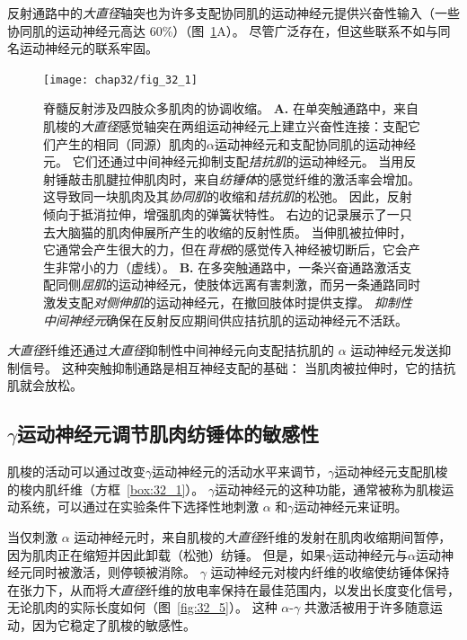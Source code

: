 反射通路中的\textit{大直径}轴突也为许多支配协同肌的运动神经元提供兴奋性输入（一些协同肌的运动神经元高达 60\%）（图~\ref{fig:32_1}A）。 
尽管广泛存在，但这些联系不如与同名运动神经元的联系牢固。


\begin{figure}[htbp]
	\centering
	\texttt{[image: chap32/fig\_32\_1]}
	\caption{脊髓反射涉及四肢众多肌肉的协调收缩。
		\textbf{A.} 在单突触通路中，来自肌梭的\textit{大直径}感觉轴突在两组运动神经元上建立兴奋性连接：支配它们产生的相同（同源）肌肉的$ \alpha $运动神经元和支配协同肌的运动神经元。 
		它们还通过中间神经元抑制支配\textit{拮抗肌}的运动神经元。
		当用反射锤敲击肌腱拉伸肌肉时，来自\textit{纺锤体}的感觉纤维的激活率会增加。
		这导致同一块肌肉及其\textit{协同肌}的收缩和\textit{拮抗肌}的松弛。
		因此，反射倾向于抵消拉伸，增强肌肉的弹簧状特性。
		右边的记录展示了一只去大脑猫的肌肉伸展所产生的收缩的反射性质。
		当伸肌被拉伸时，它通常会产生很大的力，但在\textit{背根}的感觉传入神经被切断后，它会产生非常小的力（虚线）\cite{liddell1924reflexes}。
		\textbf{B.} 在多突触通路中，一条兴奋通路激活支配同侧\textit{屈肌}的运动神经元，使肢体远离有害刺激，而另一条通路同时激发支配\textit{对侧伸肌}的运动神经元，在撤回肢体时提供支撑。
		\textit{抑制性中间神经元}确保在反射反应期间供应拮抗肌的运动神经元不活跃\cite{schmidt1989motor}。}
	\label{fig:32_1}
\end{figure}


\textit{大直径}纤维还通过\textit{大直径}抑制性中间神经元向支配拮抗肌的 $ \alpha $ 运动神经元发送抑制信号。
这种突触抑制通路是相互神经支配的基础：
当肌肉被拉伸时，它的拮抗肌就会放松。



\subsection{$ \gamma $运动神经元调节肌肉纺锤体的敏感性}

肌梭的活动可以通过改变$ \gamma $运动神经元的活动水平来调节，$ \gamma $运动神经元支配肌梭的梭内肌纤维（方框~\ref{box:32_1}）。
$ \gamma $运动神经元的这种功能，通常被称为肌梭运动系统，可以通过在实验条件下选择性地刺激 $ \alpha $ 和$ \gamma $运动神经元来证明。


当仅刺激 $ \alpha $ 运动神经元时，来自肌梭的\textit{大直径}纤维的发射在肌肉收缩期间暂停，因为肌肉正在缩短并因此卸载（松弛）纺锤。
但是，如果$ \gamma $运动神经元与$ \alpha $运动神经元同时被激活，则停顿被消除。
$ \gamma $ 运动神经元对梭内纤维的收缩使纺锤体保持在张力下，从而将\textit{大直径}纤维的放电率保持在最佳范围内，以发出长度变化信号，无论肌肉的实际长度如何（图~\ref{fig:32_5}）。 
这种 $ \alpha $-$ \gamma $ 共激活被用于许多随意运动，因为它稳定了肌梭的敏感性。


